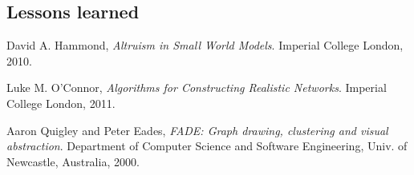 \documentclass[a4paper,11pt,titlepage]{article}
\begin{document}
\subsection{Lessons learned}

\begin{thebibliography}{9}

  David A. Hammond,
  \emph{Altruism in Small World Models}.
  Imperial College London,
  2010.

  Luke M. O'Connor,
  \emph{Algorithms for Constructing Realistic Networks}.
  Imperial College London,
  2011.

  Aaron Quigley and Peter Eades,
  \emph{FADE: Graph drawing, clustering and visual abstraction}.
  Department of Computer Science and Software Engineering,
  Univ. of  Newcastle, Australia, 2000.

\end{thebibliography}
\end{document}
